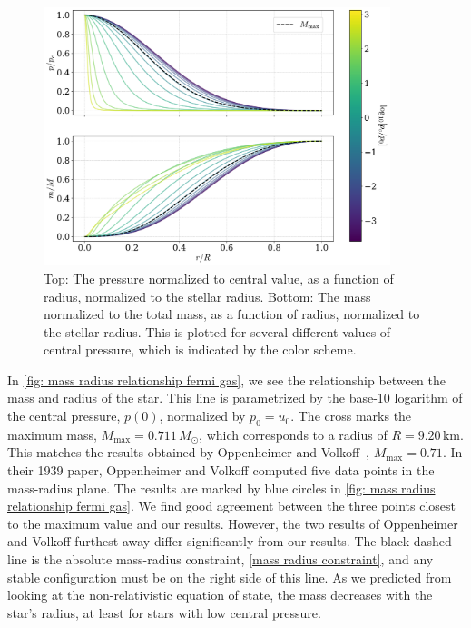 \begin{figure}[H]
    \centering
    \includegraphics[width=0.9\textwidth]{../scripts/figurer/pressure_mass.pdf}
    \caption{
        Top: The pressure normalized to central value, as a function of radius, normalized to the stellar radius.
        Bottom: The mass normalized to the total mass, as a function of radius, normalized to the stellar radius. 
        This is plotted for several different values of central pressure, which is indicated by the color scheme.
        }
    \label{fig: pressure and mass as a function of radius}
\end{figure}

In \autoref{fig: mass radius relationship fermi gas}, we see the relationship between the mass and radius of the star.
This line is parametrized by the base-10 logarithm of the central pressure, $p(0)$, normalized by $p_0 = u_0$.
The cross marks the maximum mass, $M_\mathrm{max} = 0.711 \, M_\odot$, which corresponds to a radius of $R = 9.20 \, \mathrm{km}$.
This matches the results obtained by Oppenheimer and Volkoff~\cite{oppenheimerMassiveNeutronCores1939}, $M_\mathrm{max} = 0.71$.
In their 1939 paper, Oppenheimer and Volkoff computed five data points in the mass-radius plane.
The results are marked by blue circles in \autoref{fig: mass radius relationship fermi gas}.
We find good agreement between the three points closest to the maximum value and our results.
However, the two results of Oppenheimer and Volkoff furthest away differ significantly from our results.
The black dashed line is the absolute mass-radius constraint, \autoref{mass radius constraint}, and any stable configuration must be on the right side of this line.
As we predicted from looking at the non-relativistic equation of state, the mass decreases with the star's radius, at least for stars with low central pressure.


